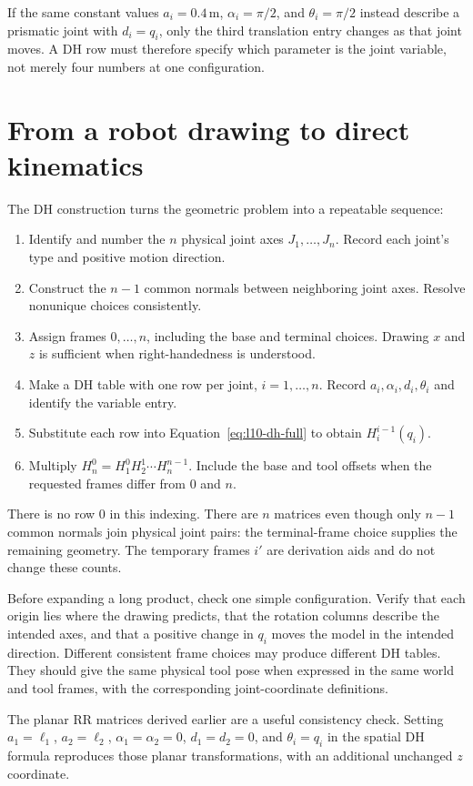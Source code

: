 If the same constant values $a_i=0.4\,\mathrm m$, $\alpha_i=\pi/2$,
and $\theta_i=\pi/2$ instead describe a prismatic joint with $d_i=q_i$,
only the third translation entry changes as that joint moves. A DH row
must therefore specify which parameter is the joint variable, not merely
four numbers at one configuration.

\clearpage
\section{From a robot drawing to direct kinematics}
\label{sec:l10-dh-procedure}
The DH construction turns the geometric problem into a repeatable sequence:
\begin{enumerate}
\item Identify and number the $n$ physical joint axes $J_1,\ldots,J_n$.
      Record each joint's type and positive motion direction.
\item Construct the $n-1$ common normals between neighboring joint axes.
      Resolve nonunique choices consistently.
\item Assign frames $0,\ldots,n$, including the base and terminal choices.
      Drawing $x$ and $z$ is sufficient when right-handedness is understood.
\item Make a DH table with one row per joint, $i=1,\ldots,n$.
      Record $a_i,\alpha_i,d_i,\theta_i$ and identify the variable entry.
\item Substitute each row into Equation~\eqref{eq:l10-dh-full} to obtain
      $H_i^{i-1}(q_i)$.
\item Multiply $H_n^0=H_1^0H_2^1\cdots H_n^{n-1}$. Include the base
      and tool offsets when the requested frames differ from 0 and $n$.
\end{enumerate}
There is no row 0 in this indexing. There are $n$ matrices even though
only $n-1$ common normals join physical joint pairs: the terminal-frame
choice supplies the remaining geometry. The temporary frames $i'$ are
derivation aids and do not change these counts.

Before expanding a long product, check one simple configuration. Verify
that each origin lies where the drawing predicts, that the rotation
columns describe the intended axes, and that a positive change in $q_i$
moves the model in the intended direction. Different consistent frame
choices may produce different DH tables. They should give the same
physical tool pose when expressed in the same world and tool frames,
with the corresponding joint-coordinate definitions.

The planar RR matrices derived earlier are a useful consistency check.
Setting $a_1=\ell_1$, $a_2=\ell_2$, $\alpha_1=\alpha_2=0$,
$d_1=d_2=0$, and $\theta_i=q_i$ in the spatial DH formula reproduces
those planar transformations, with an additional unchanged $z$ coordinate.
